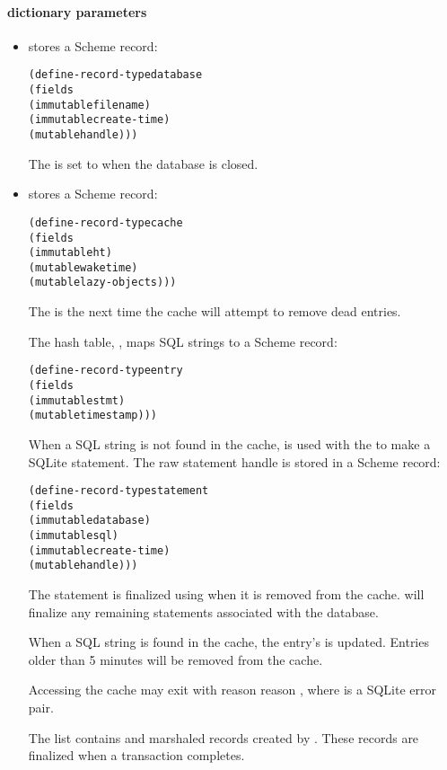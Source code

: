 \paragraph* {dictionary parameters}
\begin{itemize}

\item {} stores a Scheme record:
  \begin{alltt}
(define-record-type database
  (fields
   (immutable filename)
   (immutable create-time)
   (mutable handle)))
  \end{alltt}\antipar
  The  is set to  when the database is closed.

\item {} stores a Scheme record:
  \begin{alltt}
(define-record-type cache
  (fields
   (immutable ht)
   (mutable waketime)
   (mutable lazy-objects)))
  \end{alltt}\antipar
  The  is the next time the cache will attempt to
  remove dead entries.

  The hash table, , maps SQL strings to a Scheme record:
  \begin{alltt}
(define-record-type entry
  (fields
   (immutable stmt)
   (mutable timestamp)))
  \end{alltt}\antipar

  When a SQL string is not found in the cache,
   is used with the
   to make a SQLite statement. The raw
  statement handle is stored in a Scheme record:
  \begin{alltt}
(define-record-type statement
  (fields
   (immutable database)
   (immutable sql)
   (immutable create-time)
   (mutable handle)))
  \end{alltt}\antipar
  The statement is finalized using 
  when it is removed from the cache.  will
  finalize any remaining statements associated with the database.

  When a SQL string is found in the cache, the entry's
   is updated. Entries older than 5 minutes will
  be removed from the cache.

  Accessing the cache may exit with reason reason
  , where
   is a SQLite error pair.

  The  list contains 
  and marshaled  records created by .
  These records are finalized when a transaction completes.

\end{itemize}

